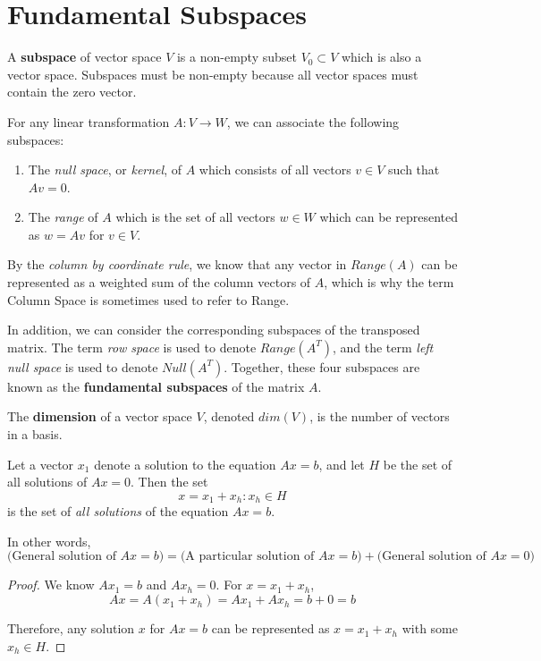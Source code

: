 \section{Fundamental Subspaces}

\begin{definition}
A \textbf{subspace} of vector space $V$ is a non-empty subset $V_{0} \subset V$ which is also a vector space. Subspaces must be non-empty because all vector spaces must contain the zero vector. 
\end{definition}

For any linear transformation $A : V \rightarrow W$, we can associate the following subspaces: 
\begin{enumerate}
	\item The \textit{null space}, or \textit{kernel}, of $A$ which consists of all vectors $v \in V$ such that $Av = 0$. 
	\item The \textit{range} of $A$ which is the set of all vectors $w \in W$ which can be represented as $w = Av$ for $v \in V$. 
\end{enumerate}

By the \textit{column by coordinate rule}, we know that any vector in $Range(A)$ can be represented as a weighted sum of the column vectors of $A$, which is why the term Column Space is sometimes used to refer to Range. 

In addition, we can consider the corresponding subspaces of the transposed matrix. The term \textit{row space} is used to denote $Range(A^{T})$, and the term \textit{left null space} is used to denote $Null(A^{T})$. Together, these four subspaces are known as the \textbf{fundamental subspaces} of the matrix $A$. 

\begin{definition}
The \textbf{dimension} of a vector space $V$, denoted $dim(V)$, is the number of vectors in a basis. 
\end{definition}

\begin{theorem} 
Let a vector $x_{1}$ denote a solution to the equation $Ax = b$, and let $H$ be the set of all solutions of $Ax = 0$. Then the set
$$x = x_{1} + x_{h} : x_{h} \in H$$
is the set of \textit{all solutions} of the equation $Ax = b$. 

In other words, 
$$\Big(\text{General solution of $Ax=b$}\Big) = \Big(\text{A particular solution of $Ax=b$}\Big) + \Big(\text{General solution of $Ax=0$}\Big)$$
\end{theorem}
\begin{proof}
We know $Ax_{1} = b$ and $Ax_{h} = 0$. For $x = x_{1} + x_{h}$,
$$Ax = A(x_{1} + x_{h}) = Ax_{1} + Ax_{h} = b + 0 = b$$

Therefore, any solution $x$ for $Ax = b$ can be represented as $x = x_{1} + x_{h}$ with some $x_{h} \in H$. 
\end{proof}

